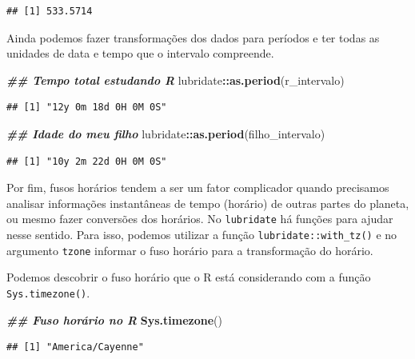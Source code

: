\documentclass[
]{article}
\newenvironment{Shaded}{\begin{snugshade}}{\end{snugshade}}
\newcommand{\DocumentationTok}[1]{\textcolor[rgb]{0.56,0.35,0.01}{\textbf{\textit{#1}}}}
\newcommand{\FunctionTok}[1]{\textcolor[rgb]{0.13,0.29,0.53}{\textbf{#1}}}
\newcommand{\NormalTok}[1]{#1}
\newcommand{\SpecialCharTok}[1]{\textcolor[rgb]{0.81,0.36,0.00}{\textbf{#1}}}
\begin{document}
\begin{verbatim}
## [1] 533.5714
\end{verbatim}

Ainda podemos fazer transformações dos dados para períodos e ter todas as unidades de data e tempo que o intervalo compreende.

\begin{Shaded}
\begin{Highlighting}[]
\DocumentationTok{\#\# Tempo total estudando R}
\NormalTok{lubridate}\SpecialCharTok{::}\FunctionTok{as.period}\NormalTok{(r\_intervalo)}
\end{Highlighting}
\end{Shaded}

\begin{verbatim}
## [1] "12y 0m 18d 0H 0M 0S"
\end{verbatim}

\begin{Shaded}
\begin{Highlighting}[]
\DocumentationTok{\#\# Idade do meu filho}
\NormalTok{lubridate}\SpecialCharTok{::}\FunctionTok{as.period}\NormalTok{(filho\_intervalo)}
\end{Highlighting}
\end{Shaded}

\begin{verbatim}
## [1] "10y 2m 22d 0H 0M 0S"
\end{verbatim}

Por fim, fusos horários tendem a ser um fator complicador quando precisamos analisar informações instantâneas de tempo (horário) de outras partes do planeta, ou mesmo fazer conversões dos horários. No \texttt{lubridate} há funções para ajudar nesse sentido. Para isso, podemos utilizar a função \texttt{lubridate::with\_tz()} e no argumento \texttt{tzone} informar o fuso horário para a transformação do horário.

Podemos descobrir o fuso horário que o R está considerando com a função \texttt{Sys.timezone()}.

\begin{Shaded}
\begin{Highlighting}[]
\DocumentationTok{\#\# Fuso horário no R}
\FunctionTok{Sys.timezone}\NormalTok{()}
\end{Highlighting}
\end{Shaded}

\begin{verbatim}
## [1] "America/Cayenne"
\end{verbatim}
\end{document}
